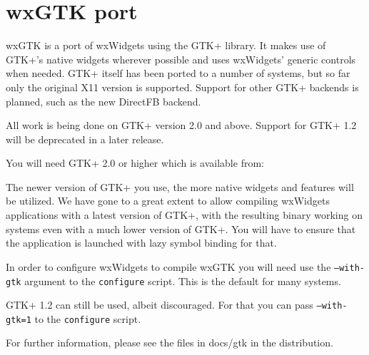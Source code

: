 \section{wxGTK port}\label{wxgtkport}

wxGTK is a port of wxWidgets using the GTK+ library.
It makes use of GTK+'s native widgets wherever possible and uses
wxWidgets' generic controls when needed. GTK+ itself has been
ported to a number of systems, but so far only the original X11
version is supported. Support for other GTK+ backends is planned,
such as the new DirectFB backend.

All work is being done on GTK+ version 2.0 and above. Support for
GTK+ 1.2 will be deprecated in a later release.

You will need GTK+ 2.0 or higher which is available from:


The newer version of GTK+ you use, the more native widgets and
features will be utilized. We have gone to a great extent to
allow compiling wxWidgets applications with a latest version of
GTK+, with the resulting binary working on systems even with a
much lower version of GTK+. You will have to ensure that the
application is launched with lazy symbol binding for that.

In order to configure wxWidgets to compile wxGTK you will 
need use the {\tt --with-gtk} argument to the {\tt configure} script.
This is the default for many systems.

GTK+ 1.2 can still be used, albeit discouraged. For that you can
pass {\tt --with-gtk=1} to the {\tt configure} script.

For further information, please see the files in docs/gtk
in the distribution.

